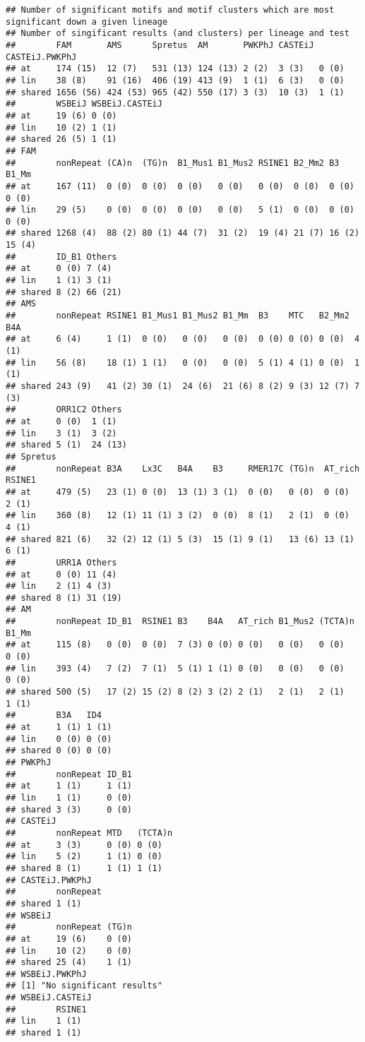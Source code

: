 \documentclass{article}\usepackage[]{graphicx}\usepackage[]{color}
\makeatletter
\newenvironment{kframe}{%
 \def\at@end@of@kframe{}%
 \ifinner\ifhmode%
  \def\at@end@of@kframe{\end{minipage}}%
  \begin{minipage}{\columnwidth}%
 \fi\fi%
 \def\FrameCommand##1{\hskip\@totalleftmargin \hskip-\fboxsep
 \colorbox{shadecolor}{##1}\hskip-\fboxsep
     \hskip-\linewidth \hskip-\@totalleftmargin \hskip\columnwidth}%
 \MakeFramed {\advance\hsize-\width
   \@totalleftmargin\z@ \linewidth\hsize
   \@setminipage}}%
 {\par\unskip\endMakeFramed%
 \at@end@of@kframe}
\newenvironment{knitrout}{}{} %
\makeatother
\begin{document}
\begin{knitrout}
\color{fgcolor}\begin{kframe}
\begin{verbatim}
## Number of significant motifs and motif clusters which are most significant down a given lineage
## Number of singificant results (and clusters) per lineage and test
##        FAM       AMS      Spretus  AM       PWKPhJ CASTEiJ CASTEiJ.PWKPhJ
## at     174 (15)  12 (7)   531 (13) 124 (13) 2 (2)  3 (3)   0 (0)         
## lin    38 (8)    91 (16)  406 (19) 413 (9)  1 (1)  6 (3)   0 (0)         
## shared 1656 (56) 424 (53) 965 (42) 550 (17) 3 (3)  10 (3)  1 (1)         
##        WSBEiJ WSBEiJ.CASTEiJ
## at     19 (6) 0 (0)         
## lin    10 (2) 1 (1)         
## shared 26 (5) 1 (1)
## FAM
##        nonRepeat (CA)n  (TG)n  B1_Mus1 B1_Mus2 RSINE1 B2_Mm2 B3     B1_Mm 
## at     167 (11)  0 (0)  0 (0)  0 (0)   0 (0)   0 (0)  0 (0)  0 (0)  0 (0) 
## lin    29 (5)    0 (0)  0 (0)  0 (0)   0 (0)   5 (1)  0 (0)  0 (0)  0 (0) 
## shared 1268 (4)  88 (2) 80 (1) 44 (7)  31 (2)  19 (4) 21 (7) 16 (2) 15 (4)
##        ID_B1 Others 
## at     0 (0) 7 (4)  
## lin    1 (1) 3 (1)  
## shared 8 (2) 66 (21)
## AMS
##        nonRepeat RSINE1 B1_Mus1 B1_Mus2 B1_Mm  B3    MTC   B2_Mm2 B4A  
## at     6 (4)     1 (1)  0 (0)   0 (0)   0 (0)  0 (0) 0 (0) 0 (0)  4 (1)
## lin    56 (8)    18 (1) 1 (1)   0 (0)   0 (0)  5 (1) 4 (1) 0 (0)  1 (1)
## shared 243 (9)   41 (2) 30 (1)  24 (6)  21 (6) 8 (2) 9 (3) 12 (7) 7 (3)
##        ORR1C2 Others 
## at     0 (0)  1 (1)  
## lin    3 (1)  3 (2)  
## shared 5 (1)  24 (13)
## Spretus
##        nonRepeat B3A    Lx3C   B4A    B3     RMER17C (TG)n  AT_rich RSINE1
## at     479 (5)   23 (1) 0 (0)  13 (1) 3 (1)  0 (0)   0 (0)  0 (0)   2 (1) 
## lin    360 (8)   12 (1) 11 (1) 3 (2)  0 (0)  8 (1)   2 (1)  0 (0)   4 (1) 
## shared 821 (6)   32 (2) 12 (1) 5 (3)  15 (1) 9 (1)   13 (6) 13 (1)  6 (1) 
##        URR1A Others 
## at     0 (0) 11 (4) 
## lin    2 (1) 4 (3)  
## shared 8 (1) 31 (19)
## AM
##        nonRepeat ID_B1  RSINE1 B3    B4A   AT_rich B1_Mus2 (TCTA)n B1_Mm
## at     115 (8)   0 (0)  0 (0)  7 (3) 0 (0) 0 (0)   0 (0)   0 (0)   0 (0)
## lin    393 (4)   7 (2)  7 (1)  5 (1) 1 (1) 0 (0)   0 (0)   0 (0)   0 (0)
## shared 500 (5)   17 (2) 15 (2) 8 (2) 3 (2) 2 (1)   2 (1)   2 (1)   1 (1)
##        B3A   ID4  
## at     1 (1) 1 (1)
## lin    0 (0) 0 (0)
## shared 0 (0) 0 (0)
## PWKPhJ
##        nonRepeat ID_B1
## at     1 (1)     1 (1)
## lin    1 (1)     0 (0)
## shared 3 (3)     0 (0)
## CASTEiJ
##        nonRepeat MTD   (TCTA)n
## at     3 (3)     0 (0) 0 (0)  
## lin    5 (2)     1 (1) 0 (0)  
## shared 8 (1)     1 (1) 1 (1)  
## CASTEiJ.PWKPhJ
##        nonRepeat
## shared 1 (1)    
## WSBEiJ
##        nonRepeat (TG)n
## at     19 (6)    0 (0)
## lin    10 (2)    0 (0)
## shared 25 (4)    1 (1)
## WSBEiJ.PWKPhJ
## [1] "No significant results"
## WSBEiJ.CASTEiJ
##        RSINE1
## lin    1 (1) 
## shared 1 (1)
\end{verbatim}
\end{kframe}
\end{knitrout}
\end{document}
